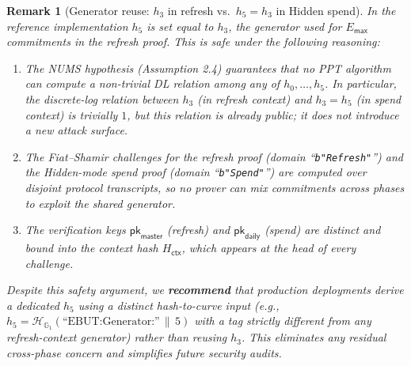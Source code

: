 \documentclass[11pt]{article}
\theoremstyle{definitionstyle}
\theoremstyle{plain}
\newtheorem*{remark}{Remark}
\begin{document}
\begin{remark}[Generator reuse: $h_3$ in refresh vs.\ $h_5 = h_3$ in Hidden spend]
In the reference implementation $h_5$ is set equal to $h_3$, the generator used for $E_{\mathsf{max}}$ commitments in the \emph{refresh} proof.  This is safe under the following reasoning:
\begin{enumerate}[leftmargin=*]
  \item The NUMS hypothesis (Assumption 2.4) guarantees that no PPT algorithm can compute a non-trivial DL relation among any of $h_0,\ldots,h_5$.  In particular, the discrete-log relation between $h_3$ (in refresh context) and $h_3 = h_5$ (in spend context) is trivially $1$, but this relation is already public; it does not introduce a new attack surface.
  \item The Fiat--Shamir challenges for the refresh proof (domain ``\texttt{b"Refresh"}'') and the Hidden-mode spend proof (domain ``\texttt{b"Spend"}'') are computed over disjoint protocol transcripts, so no prover can mix commitments across phases to exploit the shared generator.
  \item The verification keys $\mathsf{pk}_{\mathsf{master}}$ (refresh) and $\mathsf{pk}_{\mathsf{daily}}$ (spend) are distinct and bound into the context hash $H_{\mathsf{ctx}}$, which appears at the head of every challenge.
\end{enumerate}
Despite this safety argument, we \textbf{recommend} that production deployments derive a dedicated $h_5$ using a distinct hash-to-curve input (e.g., $h_5 = \mathcal{H}_{\mathbb{G}_1}(\text{``EBUT:Generator:''}\,\|\,5)$ with a tag strictly different from any refresh-context generator) rather than reusing $h_3$.  This eliminates any residual cross-phase concern and simplifies future security audits.
\end{remark}
\end{document}
